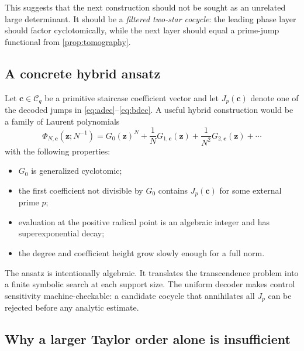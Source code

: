 \documentclass[11pt]{article}
\theoremstyle{definition}
\theoremstyle{remark}
\newcommand{\cC}{\mathcal C}
\newcommand{\vct}[1]{\bm{#1}}
\begin{document}
This suggests that the next construction should not be sought as an unrelated
large determinant.  It should be a \emph{filtered two-star cocycle}: the leading
phase layer should factor cyclotomically, while the next layer should equal a
prime-jump functional from \cref{prop:tomography}.

\subsection{A concrete hybrid ansatz}

Let $\vct c\in\cC_q$ be a primitive staircase coefficient vector and let
$J_p(\vct c)$ denote one of the decoded jumps in
\eqref{eq:adec}--\eqref{eq:bdec}.  A useful hybrid construction would be a family
of Laurent polynomials
\begin{equation}\label{eq:hybridPhi}
 \Phi_{N,\vct c}(\vct z;N^{-1})
 =G_0(\vct z)^{N}
 +\frac1N G_{1,\vct c}(\vct z)
 +\frac1{N^2}G_{2,\vct c}(\vct z)+\cdots
\end{equation}
with the following properties:
\begin{itemize}
\item $G_0$ is generalized cyclotomic;
\item the first coefficient not divisible by $G_0$ contains
$J_p(\vct c)$ for some external prime $p$;
\item evaluation at the positive radical point is an algebraic integer and has
superexponential decay;
\item the degree and coefficient height grow slowly enough for a full norm.
\end{itemize}
The ansatz is intentionally algebraic.  It translates the transcendence problem
into a finite symbolic search at each support size.  The uniform decoder makes
control sensitivity machine-checkable: a candidate cocycle that annihilates all
$J_p$ can be rejected before any analytic estimate.

\subsection{Why a larger Taylor order alone is insufficient}
\end{document}
